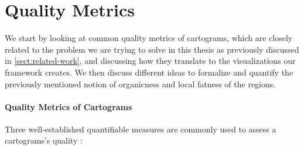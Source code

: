 \section{Quality Metrics}
\label{sect:quality-metrics}

We start by looking at common quality metrics of cartograms, which are closely related to the problem we are trying to solve in this thesis as previously discussed in \cref{sect:related-work}, and discussing how they translate to the visualizations our framework creates.
We then discuss different ideas to formalize and quantify the previously mentioned notion of organicness and local fatness of the regions.



\paragraph{Quality Metrics of Cartograms}

Three well-established quantifiable measures are commonly used to assess a cartograms's quality \cite{alam2015quantitative} \cite{nusrat2018evaluating}:


